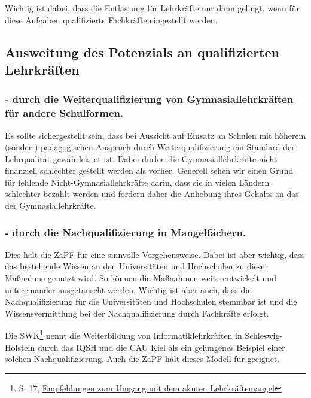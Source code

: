\documentclass[DIV=calc]{scrartcl}
\begin{document}
Wichtig ist dabei, dass die Entlastung für Lehrkräfte nur dann gelingt, wenn für diese Aufgaben qualifizierte Fachkräfte eingestellt werden.

\subsection*{Ausweitung des Potenzials an qualifizierten Lehrkräften}
\subsubsection*{- durch die Weiterqualifizierung von Gymnasiallehrkräften für andere Schulformen.}
Es sollte sichergestellt sein, dass bei Aussicht auf Einsatz an Schulen mit höherem (sonder-) pädagogischen Anspruch durch Weiterqualifizierung ein Standard der Lehrqualität gewährleistet ist.
Dabei dürfen die Gymnasiallehrkräfte nicht finanziell schlechter gestellt werden als vorher. Generell sehen wir einen Grund für fehlende Nicht-Gymnasiallehrkräfte darin, dass sie in vielen Ländern schlechter bezahlt werden und fordern daher die Anhebung ihres Gehalts an das der Gymnasiallehrkräfte.

\subsubsection*{- durch die Nachqualifizierung in Mangelfächern.}
Dies hält die ZaPF für eine sinnvolle Vorgehensweise. Dabei ist aber wichtig, dass das bestehende Wissen an den Universitäten und Hochschulen zu dieser Maßnahme genutzt wird. So können die Maßnahmen weiterentwickelt und untereinander ausgetauscht werden.
Wichtig ist aber auch, dass die Nachqualifizierung für die Universitäten und Hochschulen stemmbar ist und die Wissensvermittlung bei der Nachqualifizierung durch Fachkräfte erfolgt. 

Die SWK\footnote{S. 17, \href{https://www.kmk.org/fileadmin/Dateien/pdf/KMK/SWK/2023/SWK-2023-Stellungnahme_Lehrkraeftemangel.pdf}{Empfehlungen zum Umgang mit dem akuten Lehrkräftemangel}} nennt die Weiterbildung von Informatiklehrkräften in Schleswig-Holstein durch das IQSH und die CAU Kiel als ein gelungenes Beispiel einer solchen Nachqualifizierung. Auch die ZaPF hält dieses Modell für geeignet.
\end{document}
